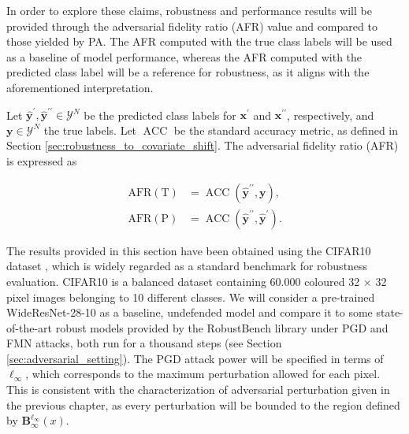 In order to explore these claims, robustness and performance results will be
provided through the adversarial fidelity ratio (AFR) value and compared to those
yielded by PA. The AFR computed with the true class labels will be used as a baseline
of model performance, whereas the AFR computed with the predicted class label
will be a reference for robustness, as it aligns with the aforementioned
interpretation.

\begin{definition}
    Let $\bm{\hat{y}^\prime}, \bm{\hat{y}^{\prime\prime}} \in \mathcal{Y}^N$ be the predicted class 
    labels for $\bm{x}^\prime$ and $\bm{x}^{\prime \prime}$, respectively, 
    and $\bm{y}\in \mathcal{Y}^N$ the true labels. Let $\operatorname{ACC}$ be the standard accuracy 
    metric, as defined in Section \ref{sec:robustness_to_covariate_shift}.
    The adversarial fidelity ratio (AFR) is expressed as

    $$
    \begin{aligned}
        \operatorname{AFR (T)} &= \operatorname{ACC}(\bm{\hat{y}^{\prime \prime}}, \bm{y}), \\
        \operatorname{AFR (P)} &= \operatorname{ACC}(\bm{\hat{y}^{\prime \prime}}, \bm{\hat{y}^{\prime}}).
    \end{aligned}
    $$

\end{definition}

The results provided in this section have been obtained using the CIFAR10 dataset
\cite{krizhevskyLearningMultipleLayers},
which is widely regarded as a standard benchmark for robustness evaluation. CIFAR10 is
a balanced dataset containing 60.000 coloured 32 $\times$ 32 pixel images belonging to 10
different classes. We will consider a pre-trained WideResNet-28-10 as a baseline, undefended
model and compare it to some state-of-the-art robust models provided by the 
RobustBench \cite{croceRobustBenchStandardizedAdversarial2021a}
library under PGD \cite{madryDeepLearningModels2019}
and FMN \cite{pintorFastMinimumnormAdversarial2021}
attacks, both run for a thousand steps (see Section \ref{sec:adversarial_setting}). 
The PGD attack power will be specified in terms of $\ell_\infty$, which corresponds
to the maximum perturbation allowed for each pixel. This is consistent with the characterization
of adversarial perturbation given in the previous chapter, as every perturbation will be bounded
to the region defined by $\mathbf{B}_\infty^{\ell_{\infty}} (x)$.

